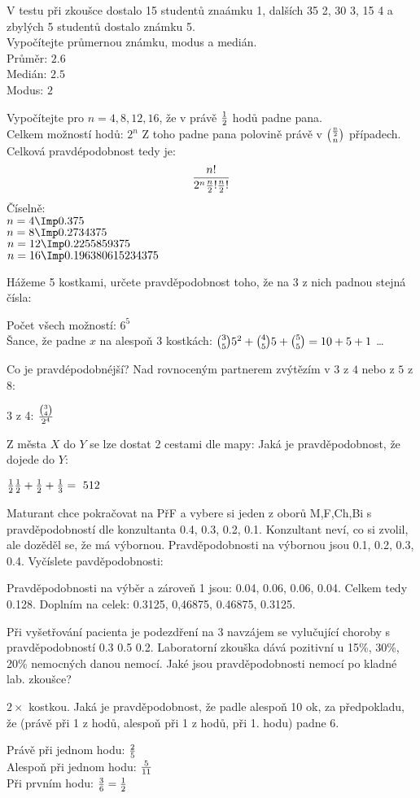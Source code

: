 \Pr  V testu při zkoušce dostalo 15 studentů znaámku 1, dalších 35 2, 30 3, 15 4 a zbylých 5 studentů dostalo známku 5.\\
Vypočítejte průmernou známku, modus a medián.\\
Průměr: $2.6$\\
Medián: $2.5$\\
Modus:  $2$

\Pr  Vypočítejte pro $n=4,8,12,16$, že v právě $\frac 1 2$ hodů padne pana.\\
Celkem možností hodů: $2^n$
Z toho padne pana polovině právě v ${\frac n 2\choose n}$ případech.
Celková pravdépodobnost tedy je:
$$\f{n!}{2^n\*\f n 2 !\*\f n 2!}$$
Číselně:\\
$n=4 \Imp 0.375$\\
$n=8 \Imp 0.2734375$\\
$n=12 \Imp 0.2255859375$\\
$n=16 \Imp 0.196380615234375$

\Pr Hážeme 5 kostkami, určete pravděpodobnost toho, že na 3 z nich padnou stejná čísla:

Počet všech možností: $6^5$\\
Šance, že padne $x$ na alespoň 3 kostkách: ${3\choose 5} \* 5^2+ {4\choose 5} \* 5 + {5\choose 5} = 10 + 5 + 1$
\dots

\Pr Co je pravdépodobnéjší? Nad rovnoceným partnerem zvýtězím v $3$ z $4$ nebo z $5$ z 8:

$3$ z 4: $\frac{{3 \choose 4}}{2^4}$

Z města $X$ do $Y$ se lze dostat 2 cestami dle mapy:
Jaká je pravděpodobnost, že dojede do $Y$:

$\f 1 2 \* \f 1 2 + \f 1 2 + \f 1 3 = \ 5 12$

\Pr Maturant chce pokračovat na PřF a vybere si jeden z oborů M,F,Ch,Bi s pravděpodobností dle konzultanta 0.4, 0.3, 0.2, 0.1.
Konzultant neví, co si zvolil, ale dozěděl se, že má výbornou.
Pravděpodobnosti na výbornou jsou 0.1, 0.2, 0.3, 0.4.
Vyčíslete pavděpodobnosti:

Pravděpodobnosti na výběr a zároveň 1 jsou: 0.04, 0.06, 0.06, 0.04.
Celkem tedy 0.128. Doplním na celek: 0.3125, 0,46875, 0.46875, 0.3125.

\Pr  Při vyšetřování pacienta je podezdření na 3 navzájem se vylučující choroby s pravděpodobností 0.3 0.5 0.2. Laboratorní zkouška dává pozitivní u 15\%, 30\%, 20\% nemocných danou nemocí. Jaké jsou pravděpodobnosti nemocí po kladné lab. zkoušce?

\Pr $2\times$ kostkou. Jaká je pravděpodobnost, že padle alespoň 10 ok, za předpokladu, že (právě při 1 z hodů, alespoň při 1 z hodů, při 1. hodu) padne 6.

Právě při jednom hodu: $\frac 2 5$\\
Alespoň při jednom hodu: $\frac 5 {11}$\\
Při prvním hodu: $\frac 3 6 = \frac 1 2$


\EndDoc
